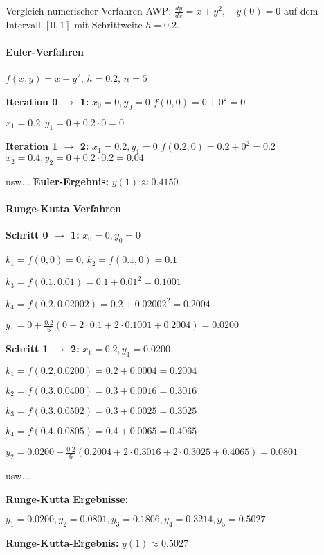 \begin{example2}{Vergleich numerischer Verfahren}
AWP: $\frac{dy}{dx} = x + y^2, \quad y(0) = 0$
auf dem Intervall $[0, 1]$ mit Schrittweite $h = 0.2$.

\paragraph{Euler-Verfahren}
$f(x,y) = x + y^2$, $h = 0.2$, $n = 5$

\textbf{Iteration 0 $\rightarrow$ 1:}
$x_0 = 0, y_0 = 0$
$f(0, 0) = 0 + 0^2 = 0$

$x_1 = 0.2, y_1 = 0 + 0.2 \cdot 0 = 0$

\textbf{Iteration 1 $\rightarrow$ 2:}
$x_1 = 0.2, y_1 = 0$
$f(0.2, 0) = 0.2 + 0^2 = 0.2$
$x_2 = 0.4, y_2 = 0 + 0.2 \cdot 0.2 = 0.04$

usw... \textbf{Euler-Ergebnis:} $y(1) \approx 0.4150$

\paragraph{Runge-Kutta Verfahren}

\textbf{Schritt 0 $\rightarrow$ 1:} $x_0 = 0, y_0 = 0$

$k_1 = f(0, 0) = 0$,
$k_2 = f(0.1, 0) = 0.1$

$k_3 = f(0.1, 0.01) = 0.1 + 0.01^2 = 0.1001$

$k_4 = f(0.2, 0.02002) = 0.2 + 0.02002^2 = 0.2004$

$y_1 = 0 + \frac{0.2}{6}(0 + 2 \cdot 0.1 + 2 \cdot 0.1001 + 0.2004) = 0.0200$

\textbf{Schritt 1 $\rightarrow$ 2:} $x_1 = 0.2, y_1 = 0.0200$

$k_1 = f(0.2, 0.0200) = 0.2 + 0.0004 = 0.2004$

$k_2 = f(0.3, 0.0400) = 0.3 + 0.0016 = 0.3016$

$k_3 = f(0.3, 0.0502) = 0.3 + 0.0025 = 0.3025$

$k_4 = f(0.4, 0.0805) = 0.4 + 0.0065 = 0.4065$

$y_2 = 0.0200 + \frac{0.2}{6}(0.2004 + 2 \cdot 0.3016 + 2 \cdot 0.3025 + 0.4065) = 0.0801$

usw... 

\textbf{Runge-Kutta Ergebnisse:}

$y_1 = 0.0200, y_2 = 0.0801, y_3 = 0.1806, y_4 = 0.3214, y_5 = 0.5027$

\textbf{Runge-Kutta-Ergebnis:} $y(1) \approx 0.5027$


\end{example2}
